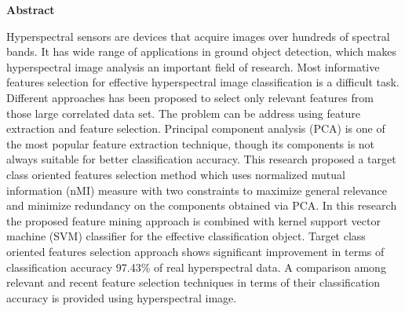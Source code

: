 \documentclass[document.tex]{subfiles}
\begin{document}
	\begin{center}
		\textbf{{\fontsize{16pt}{18}\selectfont Abstract}}
		\vspace{1cm}
	\end{center}
	Hyperspectral sensors are devices that acquire images over hundreds of spectral bands. It has wide range of applications in ground object detection, which makes hyperspectral image analysis an important field of research. Most informative features selection for effective hyperspectral image classification is a difficult task. Different approaches has been proposed to select only relevant features from those large correlated data set. The problem can be address using feature extraction and feature selection. Principal component analysis (PCA) is one of the most popular feature extraction technique, though its components is not always suitable for better classification accuracy. This research proposed a target class oriented features selection method which uses normalized mutual information (nMI) measure with two constraints to maximize general relevance and minimize redundancy on the components obtained via PCA. In this research the proposed feature mining approach is combined with kernel support vector machine (SVM) classifier for the effective classification object. Target class oriented features selection approach shows significant improvement in terms of classification accuracy 97.43\% of real hyperspectral data. A comparison among relevant and recent feature selection techniques in terms of their classification accuracy  is provided using hyperspectral image.

	\clearpage
	
\end{document}
